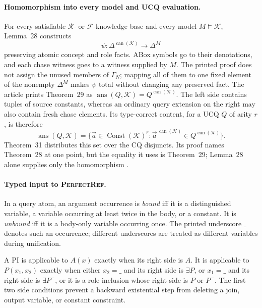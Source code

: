 \paragraph{Homomorphism into every model and UCQ evaluation.}
For every satisfiable \(\mathcal R\)- or \(\mathcal F\)-knowledge base and every
model \(M\models\mathcal K\), Lemma~28 constructs
\[
 \psi:\Delta^{\operatorname{can}(\mathcal K)}\longrightarrow\Delta^M
\]
preserving atomic concept and role facts.  ABox symbols go to their denotations,
and each chase witness goes to a witness supplied by \(M\).  The printed proof
does not assign the unused members of \(\Gamma_N\); mapping all of them to one
fixed element of the nonempty \(\Delta^M\) makes \(\psi\) total without changing
any preserved fact.  The article prints Theorem~29 as
\(\operatorname{ans}(Q,\mathcal K)=Q^{\operatorname{can}(\mathcal K)}\).
The left side contains tuples of source constants, whereas an ordinary query
extension on the right may also contain fresh chase elements.  Its type-correct
content, for a UCQ \(Q\) of arity \(r\), is therefore
\[
 \operatorname{ans}(Q,\mathcal K)
 =\{\vec a\in\operatorname{Const}(\mathcal K)^r:
     \vec a^{\,\operatorname{can}(\mathcal K)}
       \in Q^{\operatorname{can}(\mathcal K)}\}.
\]
Theorem~31 distributes this set over the CQ disjuncts.  Its proof names
Theorem~28 at one point, but the equality it uses is Theorem~29; Lemma~28
alone supplies only the homomorphism \cite[\S4]{CalvaneseEtAl2007}.

\paragraph{Typed input to \textsc{PerfectRef}.}
In a query atom, an argument occurrence is \emph{bound} iff it is a
distinguished variable, a variable occurring at least twice in the body, or a
constant.  It is \emph{unbound} iff it is a body-only variable occurring once.
The printed underscore \(\_\) denotes such an occurrence; different underscores
are treated as different variables during unification.

A PI is applicable to \(A(x)\) exactly when its right side is \(A\).  It is
applicable to \(P(x_1,x_2)\) exactly when either \(x_2=\_\) and its right side is
\(\exists P\), or \(x_1=\_\) and its right side is \(\exists P^{-}\), or it is a
role inclusion whose right side is \(P\) or \(P^{-}\).  The first two side
conditions prevent a backward existential step from deleting a join, output
variable, or constant constraint.

